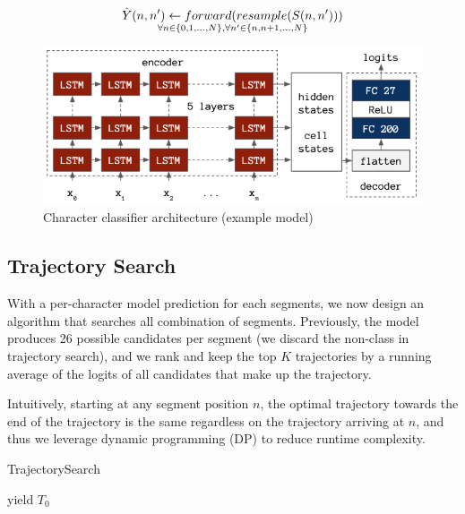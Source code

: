 \documentclass{article}
\begin{document}
\begin{multicols*}{2}
\[\hat{Y}(n, n') \gets forward(resample(S(n, n'))) 
\atop
\forall n \in \{0,1,...,N\}, \forall n' \in \{n, n+1,...,N\}\]

\begin{figure}[H]
    \centering
    \includegraphics[scale = 0.27]{classifier.png}
    \caption{Character classifier architecture (example model)}
\end{figure}

\subsection{Trajectory Search}

With a per-character model prediction for each segments, we now design an algorithm that searches all combination of segments. Previously, the model produces 26 possible candidates per segment (we discard the non-class in trajectory search), and we rank and keep the top $K$ trajectories by a running average of the logits of all candidates that make up the trajectory. 

Intuitively, starting at any segment position $n$, the optimal trajectory towards the end of the trajectory is the same regardless on the trajectory arriving at $n$, and thus we leverage dynamic programming (DP) to reduce runtime complexity.


\begin{algorithm}[H]
\SetAlgoLined
\caption{TrajectorySearch}

yield $T_0$
\end{algorithm}


\end{multicols*}
\end{document}
